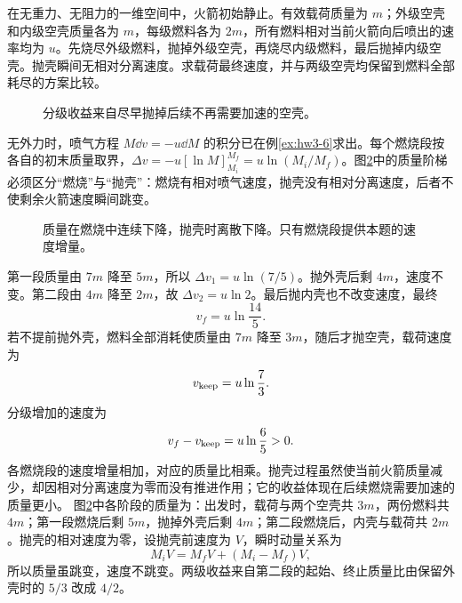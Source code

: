\begin{exercise}[两级火箭的分级收益]\label{sup3:problem-exercise-10}\label{sup3:ex:d3-h10}
在无重力、无阻力的一维空间中，火箭初始静止。有效载荷质量为 $m$；外级空壳和内级空壳质量各为 $m$，每级燃料各为 $2m$，所有燃料相对当前火箭向后喷出的速率均为 $u$。先烧尽外级燃料，抛掉外级空壳，再烧尽内级燃料，最后抛掉内级空壳。抛壳瞬间无相对分离速度。求载荷最终速度，并与两级空壳均保留到燃料全部耗尽的方案比较。
\end{exercise}
\begin{figure}[H]\centering
{}
\caption{分级收益来自尽早抛掉后续不再需要加速的空壳。}\label{sup3:fig:d3-h10-q}
\end{figure}
\begin{solution}
无外力时，喷气方程 $M\dd v=-u\dd M$ 的积分已在例\ref{ex:hw3-6}求出。每个燃烧段按各自的初末质量取界，$\Delta v=-u[\ln M]_{M_i}^{M_f}=u\ln(M_i/M_f)$。图\ref{sup3:fig:d3-h10-s}中的质量阶梯必须区分“燃烧”与“抛壳”：燃烧有相对喷气速度，抛壳没有相对分离速度，后者不使剩余火箭速度瞬间跳变。
\begin{figure}[H]\centering
{}
\caption{质量在燃烧中连续下降，抛壳时离散下降。只有燃烧段提供本题的速度增量。}\label{sup3:fig:d3-h10-s}
\end{figure}
第一段质量由 $7m$ 降至 $5m$，所以 $\Delta v_1=u\ln(7/5)$。抛外壳后剩 $4m$，速度不变。第二段由 $4m$ 降至 $2m$，故 $\Delta v_2=u\ln2$。最后抛内壳也不改变速度，最终
\[
v_f=u\ln\frac{14}5.
\]
若不提前抛外壳，燃料全部消耗使质量由 $7m$ 降至 $3m$，随后才抛空壳，载荷速度为
\[
v_{\rm keep}=u\ln\frac73.
\]
分级增加的速度为
\[
v_f-v_{\rm keep}=u\ln\frac65>0.
\]
各燃烧段的速度增量相加，对应的质量比相乘。抛壳过程虽然使当前火箭质量减少，却因相对分离速度为零而没有推进作用；它的收益体现在后续燃烧需要加速的质量更小。
图\ref{sup3:fig:d3-h10-s}中各阶段的质量为：出发时，载荷与两个空壳共 $3m$，两份燃料共 $4m$；第一段燃烧后剩 $5m$，抛掉外壳后剩 $4m$；第二段燃烧后，内壳与载荷共 $2m$。抛壳的相对速度为零，设抛壳前速度为 $V$，瞬时动量关系为
\[
M_iV=M_fV+(M_i-M_f)V,
\]
所以质量虽跳变，速度不跳变。两级收益来自第二段的起始、终止质量比由保留外壳时的 $5/3$ 改成 $4/2$。

\end{solution}
